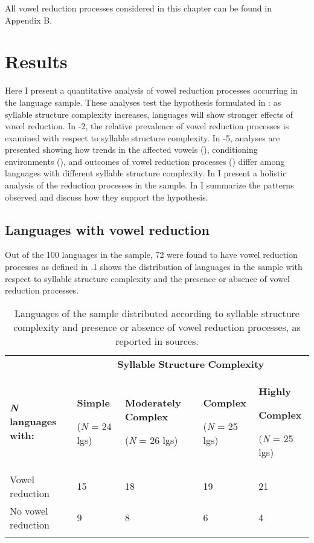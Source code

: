   All vowel reduction processes considered in this chapter can be found in Appendix B.

\section{ Results}\label{sec:6.3}

  Here I present a quantitative analysis of vowel reduction processes occurring in the language sample. These analyses test the hypothesis formulated in : as syllable structure complexity increases, languages will show stronger effects of vowel reduction. In -2, the relative prevalence of vowel reduction processes is examined with respect to syllable structure complexity. In -5, analyses are presented showing how trends in the affected vowels (), conditioning environments (), and outcomes of vowel reduction processes () differ among languages with different syllable structure complexity. In  I present a holistic analysis of the reduction processes in the sample. In  I summarize the patterns observed and discuss how they support the hypothesis.

\subsection{Languages with vowel reduction}\label{sec:6.3.1}

  Out of the 100 languages in the sample, 72 were found to have vowel reduction processes as defined in  .1 shows the distribution of languages in the sample with respect to syllable structure complexity and the presence or absence of vowel reduction processes.

\begin{table}
\begin{tabularx}{\textwidth}{XXXXX}
\lsptoprule
 & \multicolumn{4}{c}{ \textbf{Syllable} \textbf{Structure} \textbf{Complexity}}\\
 \textbf{\textit{N}} \textbf{languages} \textbf{with:} & { \textbf{Simple}}

 (\textit{N} = 24 lgs) & { \textbf{Moderately} \textbf{Complex}}

 (\textit{N} = 26 lgs) & { \textbf{Complex}}

 (\textit{N} = 25 lgs) & { \textbf{Highly} }

{ \textbf{Complex}}

 (\textit{N} = 25 lgs)\\
 Vowel reduction & 15 & 18 & 19 & 21\\
 No vowel reduction & 9 & 8 & 6 & 4\\
\lspbottomrule
\end{tabularx}
\caption{\label{6.1}Languages of the sample distributed according to syllable structure complexity and presence or absence of vowel reduction processes, as reported in sources.}
\end{table}

